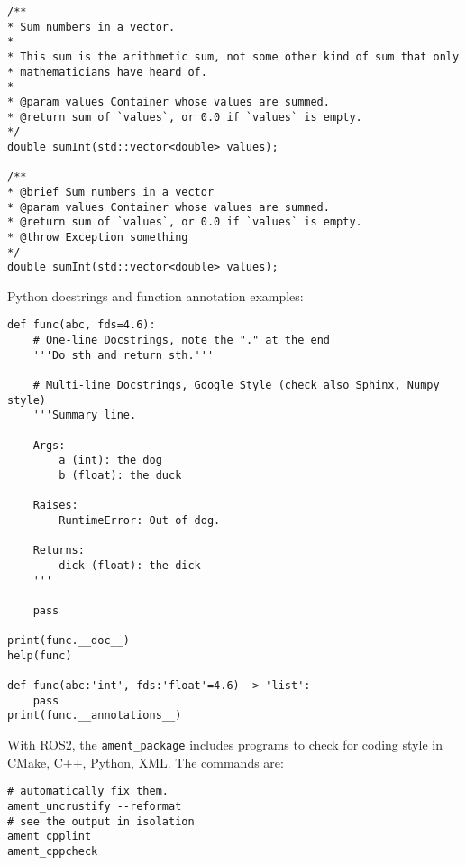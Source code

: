 \begin{verbatim}
/**
* Sum numbers in a vector.
*
* This sum is the arithmetic sum, not some other kind of sum that only
* mathematicians have heard of.
*
* @param values Container whose values are summed.
* @return sum of `values`, or 0.0 if `values` is empty.
*/
double sumInt(std::vector<double> values);

/**
* @brief Sum numbers in a vector
* @param values Container whose values are summed.
* @return sum of `values`, or 0.0 if `values` is empty.
* @throw Exception something
*/
double sumInt(std::vector<double> values);
\end{verbatim}

Python docstrings and function annotation examples:

\begin{verbatim}
def func(abc, fds=4.6):
    # One-line Docstrings, note the "." at the end
    '''Do sth and return sth.'''
    
    # Multi-line Docstrings, Google Style (check also Sphinx, Numpy style)
    '''Summary line.
    
    Args:
        a (int): the dog
        b (float): the duck
    
    Raises:
        RuntimeError: Out of dog.
    
    Returns:
        dick (float): the dick
    '''
    
    pass

print(func.__doc__)
help(func)

def func(abc:'int', fds:'float'=4.6) -> 'list':
    pass
print(func.__annotations__)
\end{verbatim}

With \ac{ROS}2, the \verb|ament_package| \cite{ament} includes programs to check for coding style in CMake, C++, Python, XML. The commands are:

\begin{verbatim}
# automatically fix them.
ament_uncrustify --reformat
# see the output in isolation
ament_cpplint
ament_cppcheck
\end{verbatim}
\clearpage